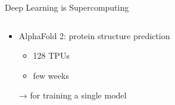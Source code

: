 \begin{frame}{Deep Learning is Supercomputing}
\protect\hypertarget{deep-learning-is-supercomputing-9}{}
\begin{columns}[T]
\begin{column}{0.4\textwidth}
\begin{itemize}
\tightlist
\item
  AlphaFold 2: protein structure prediction

  \begin{itemize}
  \tightlist
  \item
    128 TPUs
  \item
    few weeks
  \end{itemize}

  → for training a single model
\end{itemize}
\end{column}

\begin{column}{0.6\textwidth}
\vspace*{2cm}
\end{column}
\end{columns}
\end{frame}

